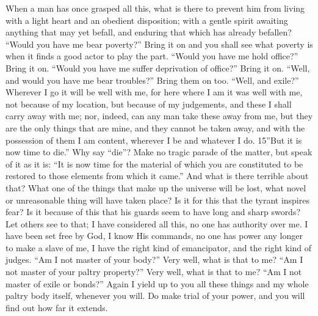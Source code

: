 When a man has once grasped all this, what is there to prevent him from living with a light heart and an obedient disposition; with a gentle spirit awaiting anything that may yet befall, and enduring that which has already befallen? ``Would you have me bear poverty?'' Bring it on and you shall see what poverty is when it finds a good actor to play the part. ``Would you have me hold office?'' Bring it on. ``Would you have me suffer deprivation of office?'' Bring it on. ``Well, and would you have me bear troubles?'' Bring them on too. ``Well, and exile?'' Wherever I go it will be well with me, for here where I am it was well with me, not because of my location, but because of my judgements, and these I shall carry away with me; nor, indeed, can any man take these away from me, but they are the only things that are mine, and they cannot be taken away, and with the possession of them I am content, wherever I be and whatever I do. 15''But it is now time to die.'' Why say ``die''? Make no tragic parade of the matter, but speak of it as it is: ``It is now time for the material of which you are constituted to be restored to those elements from which it came.'' And what is there terrible about that? What one of the things that make up the universe will be lost, what novel or unreasonable thing will have taken place? Is it for this that the tyrant inspires fear? Is it because of this that his guards seem to have long and sharp swords? Let others see to that; I have considered all this, no one has authority over me. I have been set free by God, I know His commands, no one has power any longer to make a slave of me, I have the right kind of emancipator, and the right kind of judges. ``Am I not master of your body?'' Very well, what is that to me? ``Am I not master of your paltry property?'' Very well, what is that to me? ``Am I not master of exile or bonds?'' Again I yield up to you all these things and my whole paltry body itself, whenever you will. Do make trial of your power, and you will find out how far it extends.


